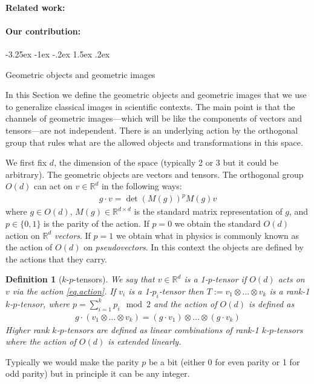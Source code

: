\documentclass{article}
\makeatletter
\theoremstyle{plain}
\newtheorem{definition}{Definition}
\newcommand{\sectionname}{Section}
\renewcommand\section{\@startsection {section}{1}{\z@}%
  {-3.25ex \@plus -1ex \@minus -.2ex}%
  {1.5ex \@plus .2ex}%
  {\raggedright\normalfont\large\bfseries}}%
\makeatother
\begin{document}
\paragraph{Related work:}

\paragraph{Our contribution:}

\section{Geometric objects and geometric images}\label{sec:geometric}

In this \sectionname{} we define the geometric objects and geometric images that we use to generalize classical images in scientific contexts.
The main point is that the channels of geometric images---which will be like the components of vectors and tensors---are not independent.
There is an underlying action by the orthogonal group that rules what are the allowed objects and transformations in this space.

We first fix $d$, the dimension of the space (typically 2 or 3 but it could be arbitrary). The geometric objects are vectors and tensors. 
The orthogonal group $O(d)$ can act on $v \in \mathbb R^d$ in the following ways:
\begin{align} \label{eq.action}
    g\cdot v = \det(M(g))^p M(g) v 
\end{align}
where $g\in O(d)$, $M(g)\in \mathbb R^{d\times d}$ is the standard matrix representation of $g$, and $p\in\{0,1\}$ is the parity of the action. If $p=0$ we obtain the standard $O(d)$ action on $\mathbb R^d$ \emph{vectors}. If $p=1$ we obtain what in physics is commonly known as the action of $O(d)$ on \emph{pseudovectors}. In this context the objects are defined by the actions that they carry.

\begin{definition}[$k$-$p$-tensors] \label{def.tensors}
We say that $v\in \mathbb R^d$ is a 1-$p$-tensor if $O(d)$ acts on $v$ via the action \eqref{eq.action}. 
If $v_i$ is a 1-$p_i$-tensor then $T:=v_{1}\otimes\ldots \otimes v_k$ is a rank-1 $k$-$p$-tensor, where $p=\sum_{i=1}^k p_i \mod 2$ and the action of $O(d)$ is defined as
\begin{align}
    g\cdot (v_{1}\otimes\ldots \otimes v_k) = (g\cdot v_1)\otimes \ldots \otimes (g\cdot v_k)
\end{align}
Higher rank $k$-$p$-tensors are defined as linear combinations of rank-1  $k$-$p$-tensors where the action of $O(d)$ is extended linearly.
\end{definition}
Typically we would make the parity $p$ be a bit (either 0 for even parity or 1 for odd parity) but in principle it can be any integer.
\end{document}
